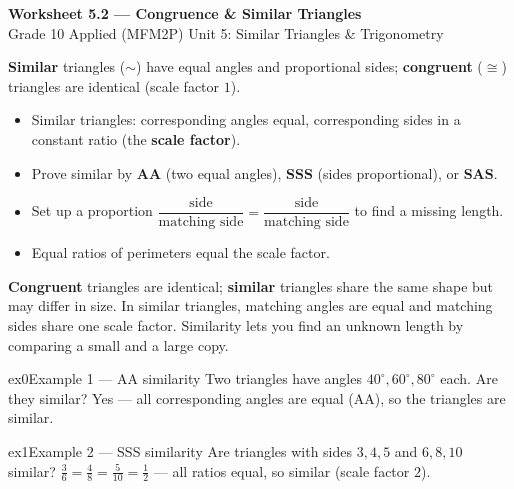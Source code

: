 \documentclass[11pt]{article}
\begin{document}
\begin{center}
{\LARGE\bfseries\color{titleblue}Worksheet 5.2 --- Congruence \& Similar Triangles}\\[2pt]
{\small Grade 10 Applied (MFM2P) \textperiodcentered{} Unit 5: Similar Triangles \& Trigonometry}
\end{center}

\begin{ideabox}
\textbf{Similar} triangles ($\sim$) have equal angles and proportional sides; \textbf{congruent} ($\cong$) triangles are identical (scale factor $1$).
\begin{itemize}[leftmargin=*,itemsep=2pt]
  \item Similar triangles: corresponding angles equal, corresponding sides in a constant ratio (the \textbf{scale factor}).
  \item Prove similar by \textbf{AA} (two equal angles), \textbf{SSS} (sides proportional), or \textbf{SAS}.
  \item Set up a proportion $\dfrac{\text{side}}{\text{matching side}}=\dfrac{\text{side}}{\text{matching side}}$ to find a missing length.
  \item Equal ratios of perimeters equal the scale factor.
\end{itemize}
\end{ideabox}

\begin{learnbox}
\textbf{Congruent} triangles are identical; \textbf{similar} triangles share the same shape but may differ in size.
In similar triangles, matching angles are equal and matching sides share one scale factor.
Similarity lets you find an unknown length by comparing a small and a large copy.
\end{learnbox}


\begin{example}{ex0}{Example 1 --- AA similarity}
Two triangles have angles $40^\circ,60^\circ,80^\circ$ each. Are they similar?
\soln Yes --- all corresponding angles are equal (AA), so the triangles are similar.
\end{example}

\begin{example}{ex1}{Example 2 --- SSS similarity}
Are triangles with sides $3,4,5$ and $6,8,10$ similar?
\soln $\tfrac{3}{6}=\tfrac{4}{8}=\tfrac{5}{10}=\tfrac12$ --- all ratios equal, so similar (scale factor $2$).
\end{example}
\end{document}
